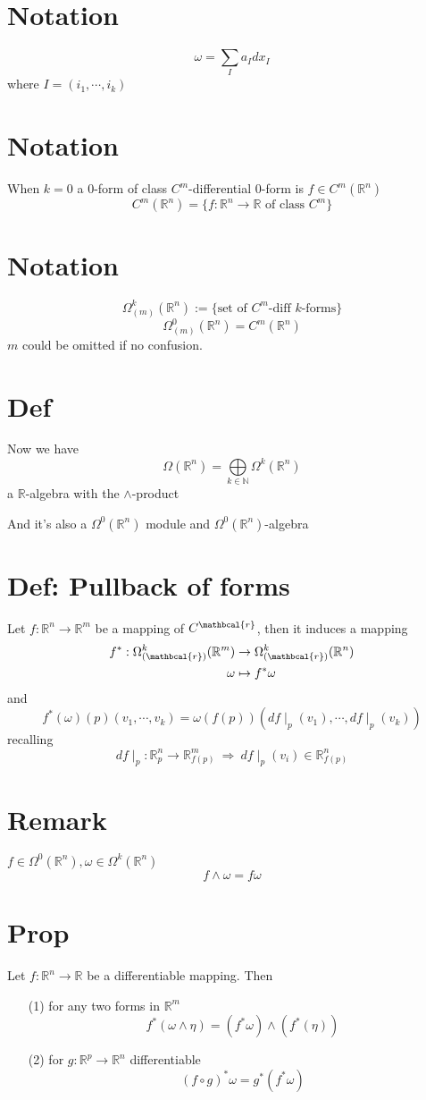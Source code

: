 \documentclass{book}
\begin{document}
\section{Notation}
$$\omega=\sum\limits_{I}a_Idx_I$$
where $I=(i_1,\cdots,i_k)$
\section{Notation}
When $k=0$ a $0$-form of class $C^m$-differential 0-form is $f\in C^m(\mathbb{R}^n)$$$C^m(\mathbb{R}^n)=\{f:\mathbb{R}^n\rightarrow \mathbb{R}\text{ of class }C^m\}$$
\section{Notation}
$$\Omega^k_{(m)}(\mathbb{R}^n):=\{\text{set of }C^m\text{-diff }k\text{-forms}\}$$
$$\Omega^0_{(m)}(\mathbb{R}^n)=C^m(\mathbb{R}^n)$$
$m$ could be omitted if no confusion.
\section{Def}
Now we have $$\Omega(\mathbb{R}^n)=\bigoplus\limits_{k\in \mathbb{N}}\Omega^k(\mathbb{R}^n)$$ a $\mathbb{R}$-algebra with the $\wedge$-product

And it's also a $\Omega^0(\mathbb{R}^n)$ module and $\Omega^0(\mathbb{R}^n)$-algebra

\section{Def: Pullback of forms}
Let $f:\mathbb{R}^n\rightarrow \mathbb{R}^m$ be a mapping of $C^\mathbcal{r}$, then it induces a mapping 
$$\begin{aligned}
    f^*:\Omega^k_{(\mathbcal{r})}(\mathbb{R}^m)&\rightarrow\Omega^k_{(\mathbcal{r})}(\mathbb{R}^n)\\\omega&\mapsto f^*\omega
\end{aligned}$$
and $$f^*(\omega)(p)(v_1,\cdots,v_k)=\omega(f(p))(df\mid_p(v_1),\cdots,df\mid_p(v_k))$$
recalling$$df\mid_p:\mathbb{R}^n_p\rightarrow\mathbb{R}^m_{f(p)}\ \Rightarrow\ df\mid_p(v_i)\in \mathbb{R}^n_{f(p)}$$
\section{Remark}
$f\in \Omega^0(\mathbb{R}^n),\omega\in \Omega^k(\mathbb{R}^n)$$$f\wedge\omega=f\omega$$
\section{Prop}
Let $f:\mathbb{R}^n\rightarrow\mathbb{R}$ be a differentiable mapping. Then
\begin{itemize}
    \item [(1)]for any two forms in $\mathbb{R}^m$$$f^*(\omega\wedge\eta)=(f^*\omega)\wedge(f^*(\eta))$$
    \item [(2)]for $g:\mathbb{R}^p\rightarrow\mathbb{R}^n$ differentiable$$(f\circ g)^*\omega=g^*(f^*\omega)$$
\end{itemize}
\end{document}
